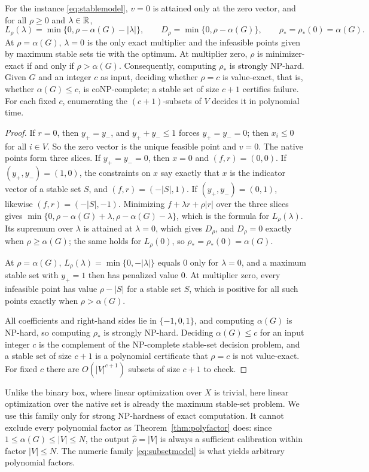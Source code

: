 \begin{proposition}\label{prop:stableset}
For the instance \eqref{eq:stablemodel}, $v=0$ is attained only at the
zero vector, and for all $\rho\ge0$ and $\lambda\in\mathbb R$,
\begin{equation}\label{eq:stabledual}
 L_\rho(\lambda)=\min\{0,\rho-\alpha(G)-|\lambda|\},\qquad
 D_\rho=\min\{0,\rho-\alpha(G)\},\qquad \rho_*=\rho_*(0)=\alpha(G).
\end{equation}
At $\rho=\alpha(G)$, $\lambda=0$ is the only exact multiplier and the
infeasible points given by maximum stable sets tie with the optimum. At
multiplier zero, $\rho$ is minimizer-exact if and only if $\rho>\alpha(G)$.
Consequently, computing $\rho_*$ is strongly NP-hard. Given $G$ and an
integer $c$ as input, deciding whether $\rho=c$ is value-exact, that is,
whether $\alpha(G)\le c$, is coNP-complete; a stable set of size $c+1$
certifies failure. For each fixed $c$, enumerating the $(c+1)$-subsets of
$V$ decides it in polynomial time.
\end{proposition}
\begin{proof}
If $r=0$, then $y_+=y_-$, and $y_++y_-\le1$ forces $y_+=y_-=0$; then
$x_i\le0$ for all $i\in V$. So the zero vector is the unique feasible point and
$v=0$. The native points form three slices. If $y_+=y_-=0$, then $x=0$
and $(f,r)=(0,0)$. If $(y_+,y_-)=(1,0)$, the constraints on $x$ say exactly
that $x$ is the indicator vector of a stable set $S$, and
$(f,r)=(-|S|,1)$. If $(y_+,y_-)=(0,1)$, likewise $(f,r)=(-|S|,-1)$.
Minimizing $f+\lambda r+\rho|r|$ over the three slices gives
$\min\{0,\rho-\alpha(G)+\lambda,\rho-\alpha(G)-\lambda\}$, which is the
formula for $L_\rho(\lambda)$. Its supremum over $\lambda$ is attained at
$\lambda=0$, which gives $D_\rho$, and $D_\rho=0$ exactly when
$\rho\ge\alpha(G)$; the same holds for $L_\rho(0)$, so
$\rho_*=\rho_*(0)=\alpha(G)$.

At $\rho=\alpha(G)$, $L_\rho(\lambda)=\min\{0,-|\lambda|\}$ equals $0$ only
for $\lambda=0$, and a maximum stable set with $y_+=1$ then has penalized
value $0$. At multiplier zero, every infeasible point has value
$\rho-|S|$ for a stable set $S$, which is positive for all such points
exactly when $\rho>\alpha(G)$.

All coefficients and right-hand sides lie in $\{-1,0,1\}$, and computing
$\alpha(G)$ is NP-hard, so computing $\rho_*$ is strongly NP-hard.
Deciding $\alpha(G)\le c$ for an input integer $c$ is the complement of the
NP-complete stable-set decision problem, and a stable set of size $c+1$ is
a polynomial certificate that $\rho=c$ is not value-exact. For fixed $c$
there are $O(|V|^{c+1})$ subsets of size $c+1$ to check.
\end{proof}
Unlike the binary box, where linear optimization over $X$ is trivial, here
linear optimization over the native set is already the maximum stable-set
problem. We use this family only for strong NP-hardness of exact
computation. It cannot exclude every polynomial factor as
Theorem~\ref{thm:polyfactor} does: since $1\le\alpha(G)\le|V|\le N$, the output $\widehat\rho=|V|$ is
always a sufficient calibration within factor $|V|\le N$. The numeric
family \eqref{eq:subsetmodel} is what yields arbitrary polynomial factors.

